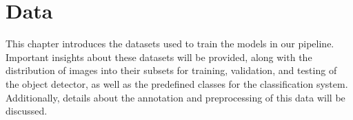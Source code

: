 \chapter{Data}\label{ch:data}

This chapter introduces the datasets used to train the models in our pipeline. Important insights about these datasets will be provided, along with the distribution of images into their subsets for training, validation, and testing of the object detector, as well as the predefined classes for the classification system. Additionally, details about the annotation and preprocessing of this data will be discussed.





